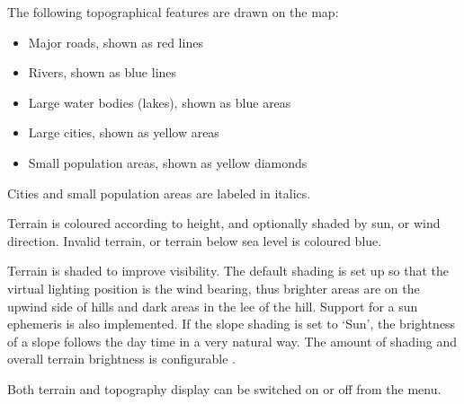 The following topographical features are drawn on the map:
\begin{itemize}
\item Major roads, shown as red lines
\item Rivers, shown as blue lines
\item Large water bodies (lakes), shown as blue areas
\item Large cities, shown as yellow areas
\item Small population areas, shown as yellow diamonds
\end{itemize}
Cities and small population areas are labeled in italics.

Terrain is coloured according to height, and optionally shaded by sun, or 
wind direction.  Invalid terrain, or terrain below
sea level is coloured blue.


Terrain is shaded to improve visibility.  The default shading
is set up so that the virtual lighting position is the wind bearing,
thus brighter areas are on the upwind side of hills and dark areas in
the lee of the hill.  
Support for a sun ephemeris is also implemented. If the slope shading is set 
to `Sun', the brightness of a slope follows the day time in a very natural way.
The amount of shading and overall terrain brightness is configurable .

Both terrain and topography display can be switched on or off from the
menu.

